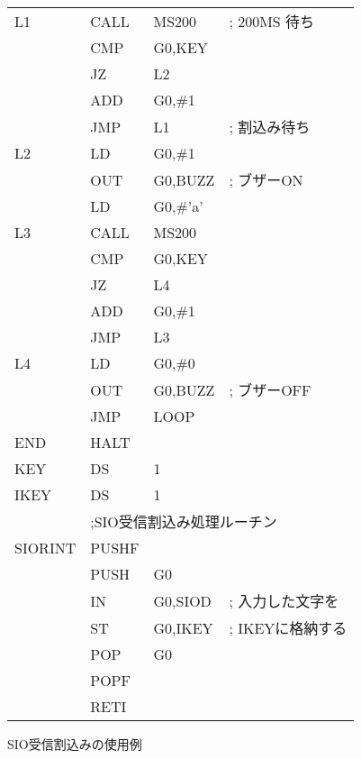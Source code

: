 \begin{figure}[btp]
{\begin{center}
\begin{tabular}{|l|l l l|}
L1      & CALL    & MS200          & ; 200MS 待ち\\
        & CMP     & G0,KEY         & \\
        & JZ      & L2             & \\
        & ADD     & G0,\#1         & \\
        & JMP     & L1             & ; 割込み待ち\\
L2      & LD      & G0,\#1         & \\
        & OUT     & G0,BUZZ        & ; ブザーON\\
        & LD      & G0,\#'a'       & \\
L3      & CALL    & MS200          & \\
        & CMP     & G0,KEY         & \\
        & JZ      & L4             & \\
        & ADD     & G0,\#1         & \\
        & JMP     & L3             & \\
L4      & LD      & G0,\#0         & \\
        & OUT     & G0,BUZZ        & ; ブザーOFF\\
        & JMP     & LOOP           & \\
END     & HALT    &                & \\
KEY     & DS      & 1              & \\
IKEY    & DS      & 1              & \\
        & \multicolumn{3}{|l|}{;SIO受信割込み処理ルーチン} \\
SIORINT & PUSHF   &                & \\
        & PUSH    & G0             & \\
        & IN      & G0,SIOD        & ; 入力した文字を\\
        & ST      & G0,IKEY        & ; IKEYに格納する\\
        & POP     & G0             & \\
        & POPF    &                & \\
        & RETI    &                & \\
\hline
\end{tabular}
\end{center}}
\caption{SIO受信割込みの使用例}
\label{fig:chap6:sioin}
\end{figure}


